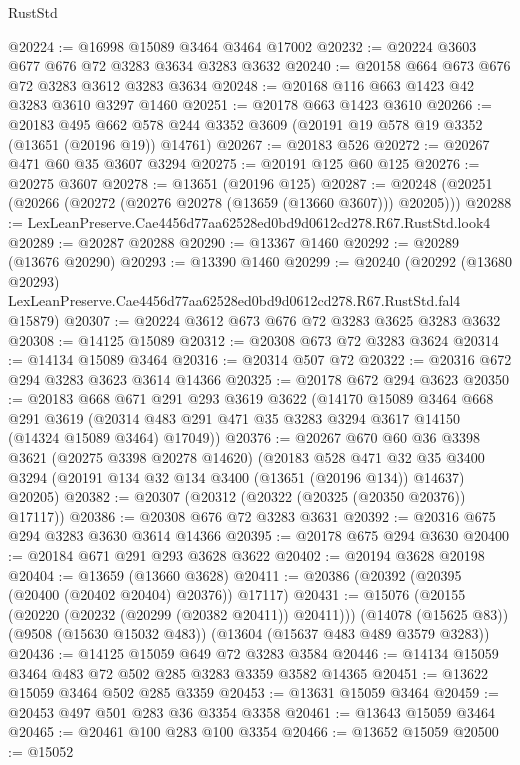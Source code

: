 \begin{lexlean}{RustStd}
\begin{coremodule}
@20224 := @16998 @15089 @3464 @3464 @17002
@20232 := @20224 @3603 @677 @676 @72 @3283 @3634 @3283 @3632
@20240 := @20158 @664 @673 @676 @72 @3283 @3612 @3283 @3634
@20248 := @20168 @116 @663 @1423 @42 @3283 @3610 @3297 @1460
@20251 := @20178 @663 @1423 @3610
@20266 := @20183
    @495
    @662
    @578
    @244
    @3352
    @3609
    (@20191 @19 @578 @19 @3352 (@13651 (@20196 @19)) @14761)
@20267 := @20183 @526
@20272 := @20267 @471 @60 @35 @3607 @3294
@20275 := @20191 @125 @60 @125
@20276 := @20275 @3607
@20278 := @13651 (@20196 @125)
@20287 := @20248 (@20251 (@20266 (@20272 (@20276 @20278 (@13659 (@13660 @3607))) @20205)))
@20288 := LexLeanPreserve.Cae4456d77aa62528ed0bd9d0612cd278.R67.RustStd.look4
@20289 := @20287 @20288
@20290 := @13367 @1460
@20292 := @20289 (@13676 @20290)
@20293 := @13390 @1460
@20299 := @20240
    (@20292
      (@13680 @20293)
      LexLeanPreserve.Cae4456d77aa62528ed0bd9d0612cd278.R67.RustStd.fal4
      @15879)
@20307 := @20224 @3612 @673 @676 @72 @3283 @3625 @3283 @3632
@20308 := @14125 @15089
@20312 := @20308 @673 @72 @3283 @3624
@20314 := @14134 @15089 @3464
@20316 := @20314 @507 @72
@20322 := @20316 @672 @294 @3283 @3623 @3614 @14366
@20325 := @20178 @672 @294 @3623
@20350 := @20183
    @668
    @671
    @291
    @293
    @3619
    @3622
    (@14170
      @15089
      @3464
      @668
      @291
      @3619
      (@20314 @483 @291 @471 @35 @3283 @3294 @3617 @14150 (@14324 @15089 @3464) @17049))
@20376 := @20267
    @670
    @60
    @36
    @3398
    @3621
    (@20275 @3398 @20278 @14620)
    (@20183
      @528
      @471
      @32
      @35
      @3400
      @3294
      (@20191 @134 @32 @134 @3400 (@13651 (@20196 @134)) @14637)
      @20205)
@20382 := @20307 (@20312 (@20322 (@20325 (@20350 @20376)) @17117))
@20386 := @20308 @676 @72 @3283 @3631
@20392 := @20316 @675 @294 @3283 @3630 @3614 @14366
@20395 := @20178 @675 @294 @3630
@20400 := @20184 @671 @291 @293 @3628 @3622
@20402 := @20194 @3628 @20198
@20404 := @13659 (@13660 @3628)
@20411 := @20386 (@20392 (@20395 (@20400 (@20402 @20404) @20376)) @17117)
@20431 := @15076
    (@20155 (@20220 (@20232 (@20299 (@20382 @20411)) @20411)))
    (@14078 (@15625 @83))
    (@9508 (@15630 @15032 @483))
    (@13604 (@15637 @483 @489 @3579 @3283))
@20436 := @14125 @15059 @649 @72 @3283 @3584
@20446 := @14134 @15059 @3464 @483 @72 @502 @285 @3283 @3359 @3582 @14365
@20451 := @13622 @15059 @3464 @502 @285 @3359
@20453 := @13631 @15059 @3464
@20459 := @20453 @497 @501 @283 @36 @3354 @3358
@20461 := @13643 @15059 @3464
@20465 := @20461 @100 @283 @100 @3354
@20466 := @13652 @15059
@20500 := @15052

\end{coremodule}
\end{lexlean}
